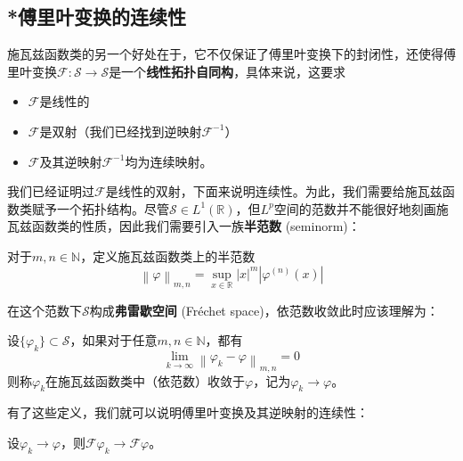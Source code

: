 \subsection{*傅里叶变换的连续性}\label{sub:fourier_continuous}
施瓦兹函数类的另一个好处在于，它不仅保证了傅里叶变换下的封闭性，还使得傅里叶变换$\mathcal{F} :\mathcal{S} \to \mathcal{S} $是一个\textbf{线性拓扑自同构}，具体来说，这要求\begin{itemize}
    \item $\mathcal{F} $是线性的
    \item $\mathcal{F} $是双射（我们已经找到逆映射$\mathcal{F} ^{-1} $）
    \item $\mathcal{F} $及其逆映射$\mathcal{F} ^{-1} $均为连续映射。
\end{itemize}
我们已经证明过$\mathcal{F}$是线性的双射，下面来说明连续性。为此，我们需要给施瓦兹函数类赋予一个拓扑结构。尽管$\mathcal{S}\in L^1(\mathbb{R} )$，但$L^p$空间的范数并不能很好地刻画施瓦兹函数类的性质，因此我们需要引入一族\textbf{半范数} (seminorm)：
\begin{definition}[*施瓦兹函数类的半范数]
    对于$m,n\in\mathbb{N} $，定义施瓦兹函数类上的半范数
    \[\left\|\varphi\right\|_{m,n}=\sup_{x\in\mathbb{R} }|x|^m\left|\varphi^{(n)}(x)\right|\]
\end{definition}
在这个范数下$\mathcal{S} $构成\textbf{弗雷歇空间} (Fréchet space)，依范数收敛此时应该理解为：
\begin{definition}[*施瓦兹函数类中的收敛]
    设$\{\varphi_k\}\subset\mathcal{S} $，如果对于任意$m,n\in\mathbb{N} $，都有
    \[\lim_{k\to\infty}\left\|\varphi_k-\varphi\right\|_{m,n}=0\]
    则称$\varphi_k$在施瓦兹函数类中（依范数）收敛于$\varphi$，记为$\varphi_k\to \varphi$。
\end{definition}
有了这些定义，我们就可以说明傅里叶变换及其逆映射的连续性：
\begin{theorem}
    设$\varphi_k\to \varphi$，则$\mathcal{F} \varphi_k\to \mathcal{F} \varphi$。
\end{theorem}
